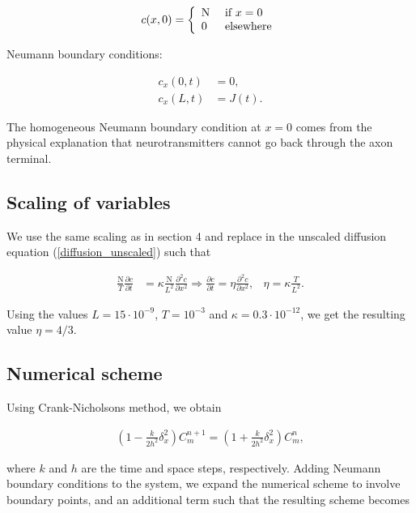 \[ c(x,0) = \left\{ 
  \begin{array}{l l}
    \textrm{N} & \text{ if } x = 0\\
    0 & \text{ elsewhere}
  \end{array} \right.\]

Neumann boundary conditions:

\begin{align*}
c_x(0,t) &= 0, \\
c_x(L,t) &= J(t).
\end{align*}


The homogeneous Neumann boundary condition at $x = 0$ comes from the physical explanation that neurotransmitters cannot go back through the axon terminal.




\subsection{Scaling of variables}


We use the same scaling as in section 4 and replace in the unscaled diffusion equation (\ref{diffusion_unscaled}) such that

\begin{align*}
\frac{\textrm{N}}{T}\frac{\partial c}{\partial t} &= \kappa \frac{\textrm{N}}{L^2}\frac{\partial^2c}{\partial x^2} \Rightarrow
\frac{\partial c}{\partial t} = \eta \frac{\partial^2c}{\partial x^2}, & \eta = \kappa\frac{T}{L^2}.
\end{align*}

Using the values $L = 15 \cdot 10^{-9}$, $T = 10^{-3}$ and $\kappa = 0.3\cdot 10^{-12}$, we get the resulting value $\eta = 4/3$.




\subsection{Numerical scheme}

Using Crank-Nicholsons method, we obtain 

\begin{align*}
(1 - \frac{k}{2h^2} \delta^2_x)C^{n+1}_m = (1 + \frac{k}{2h^2} \delta^2_x) C_m^n,
\end{align*}

where $k$ and $h$ are the time and space steps, respectively. Adding Neumann boundary conditions to the system, we expand the numerical scheme to involve boundary points, and an additional term such that the resulting scheme becomes

